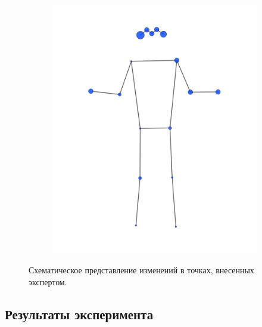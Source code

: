 \begin{figure}[h]
\begin{subfigure}[b]{0.4\textwidth}
	\includegraphics[width=\textwidth]{./images/data_info/pose_markup_examples/big_change_percentage}
	\caption{}
	\label{fig:big_correction}
\end{subfigure}
\caption{Схематическое представление изменений в точках, внесенных экспертом.}
\label{fig:correction_heatmap}
\end{figure}

\subsection{Результаты эксперимента}





